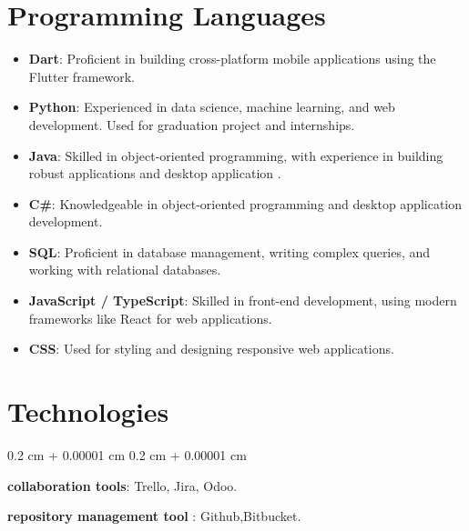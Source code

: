 \documentclass[10pt, letterpaper]{article}
\newenvironment{onecolentry}{
    \begin{adjustwidth}{
        0.2 cm + 0.00001 cm
    }{
        0.2 cm + 0.00001 cm
    }
}{
    \end{adjustwidth}
} %
\begin{document}
\section*{Programming Languages}
        \vspace{0.2 cm}
\begin{itemize}
    \item \textbf{Dart}: Proficient in building cross-platform mobile applications using the Flutter framework.
    \item \textbf{Python}: Experienced in data science, machine learning, and web development. Used for graduation project and internships.
    \item \textbf{Java}: Skilled in object-oriented programming, with experience in building robust applications and desktop application .
    \item \textbf{C\#}: Knowledgeable in object-oriented programming and desktop application development.
    \item \textbf{SQL}: Proficient in database management, writing complex queries, and working with relational databases.
    \item \textbf{JavaScript / TypeScript}: Skilled in front-end development, using modern frameworks like React for web applications.
    \item \textbf{CSS}: Used for styling and designing responsive web applications.
\end{itemize}
            \vspace{2 cm}
    \section{Technologies}

        \vspace{0.2 cm}
        \begin{onecolentry}
 \item \textbf{collaboration tools}: Trello, Jira, Odoo.
  \item \textbf{repository management tool }: Github,Bitbucket.
        \end{onecolentry}


    
\end{document}
